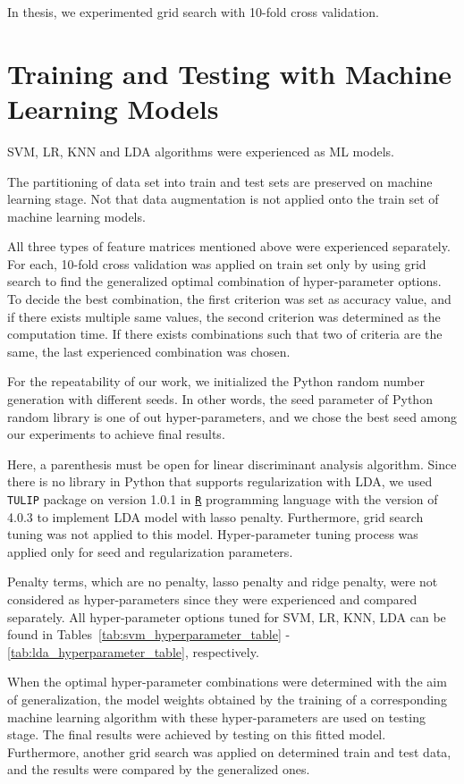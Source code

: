 In thesis, we experimented grid search with 10-fold cross validation.

\section{Training and Testing with Machine Learning Models} \label{CH5:train_test_ml}

SVM, LR, KNN and LDA algorithms were experienced as ML models.

The partitioning of data set into train and test sets are preserved on machine learning stage. Not that data augmentation is not applied onto the train set of machine learning models. 

All three types of feature matrices mentioned above were experienced separately. For each, 10-fold cross validation was applied on train set only by using grid search to find the generalized optimal combination of hyper-parameter options. To decide the best combination, the first criterion was set as accuracy value, and if there exists multiple same values, the second criterion was determined as the computation time. If there exists combinations such that two of criteria are the same, the last experienced combination was chosen. 

For the repeatability of our work, we initialized the Python random number generation with different seeds. In other words, the seed parameter of Python random library is one of out hyper-parameters, and we chose the best seed among our experiments to achieve final results.

Here, a parenthesis must be open for linear discriminant analysis algorithm. Since there is no library in Python that supports regularization with LDA, we used \texttt{TULIP} package \cite{TULIP_package} on version 1.0.1 in \href{https://cran.r-project.org/bin/windows/base/old/4.0.3/}{\texttt{R}} programming language with the version of 4.0.3 to implement LDA model with lasso penalty. Furthermore, grid search tuning was not applied to this model. Hyper-parameter tuning process was applied only for seed and regularization parameters.

Penalty terms, which are no penalty, lasso penalty and ridge penalty, were not considered as hyper-parameters since they were experienced and compared separately. All hyper-parameter options tuned for SVM, LR, KNN, LDA can be found in Tables~\ref{tab:svm_hyperparameter_table} -\ref{tab:lda_hyperparameter_table}, respectively.

When the optimal hyper-parameter combinations were determined with the aim of generalization, the model weights obtained by the training of a corresponding machine learning algorithm with these hyper-parameters are used on testing stage. The final results were achieved by testing on this fitted model. Furthermore, another grid search was applied on determined train and test data, and the results were compared by the generalized ones.

